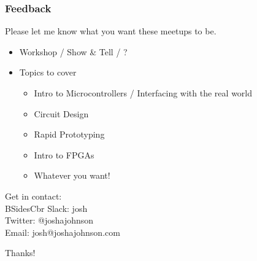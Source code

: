 \documentclass[t]{beamer}
\begin{document}
\begin{frame}
\frametitle{Feedback}
Please let me know what you want these meetups to be. \\
\begin{itemize}
\item Workshop / Show \& Tell / ?
\item Topics to cover
\begin{itemize}
	\item Intro to Microcontrollers / Interfacing with the real world
	\item Circuit Design
	\item Rapid Prototyping
	\item Intro to FPGAs
	\item Whatever you want!
\end{itemize}
\end{itemize}
\vspace{5mm}
Get in contact: \\
BSidesCbr Slack: josh\\
Twitter: @joshajohnson\\
Email: josh@joshajohnson.com\\
\end{frame}



\begin{frame}
\vspace{35mm}
\Huge{\centerline{Thanks!}}
\end{frame}
\end{document}
